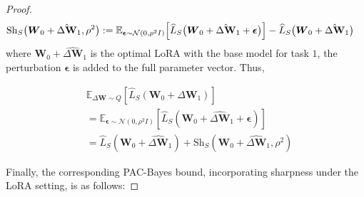 \documentclass[letterpaper]{article} %
\begin{document}
\begin{proof}
\begin{equation}
\begin{aligned}
&\mathrm{Sh}_S\big(\boldsymbol{W}_0 + \hat{\Delta\mathbf{W}}_1, \rho^2\big) :=  \mathbb{E}_{\boldsymbol{\epsilon} \sim \mathcal{N}(0, \rho^2 I)} \Big[
    \widehat{L}_S\big(\boldsymbol{W}_0 + \hat{\Delta\mathbf{W}}_1 + \boldsymbol{\epsilon}\big)
\Big]  
- \widehat{L}_S\big(\boldsymbol{W}_0 + \hat{\Delta\mathbf{W}}_1\big) 
\notag
\end{aligned}
\end{equation}
where $\boldsymbol{W}_0 +\hat{\Delta\boldsymbol{W}}_1$ is the optimal LoRA with the base model for task $1$, the perturbation $\boldsymbol{\epsilon}$ is added to the full parameter vector. Thus,

\begin{equation}
    \begin{aligned}
    &\mathbb{E}_{\Delta\mathbf{W} \sim Q}[\widehat{L}_S(\mathbf{W}_0 + \Delta\mathbf{W}_1)] \\
    &= \mathbb{E}_{\boldsymbol{\epsilon} \sim \mathcal{N}(0, \rho^2 I)}[\widehat{L}_S(\mathbf{W}_0 + \hat{\Delta\mathbf{W}}_1 + \boldsymbol{\epsilon})]  \\
    &=\widehat{L}_S(\mathbf{W}_0 + \hat{\Delta\mathbf{W}}_1) + \mathrm{Sh}_S(\mathbf{W}_0+\hat{\Delta\mathbf{W}}_1, \rho^2)
\end{aligned}
\end{equation}


Finally, the corresponding PAC-Bayes bound, incorporating sharpness under the LoRA setting, is as follows:




\end{proof}
\end{document}
